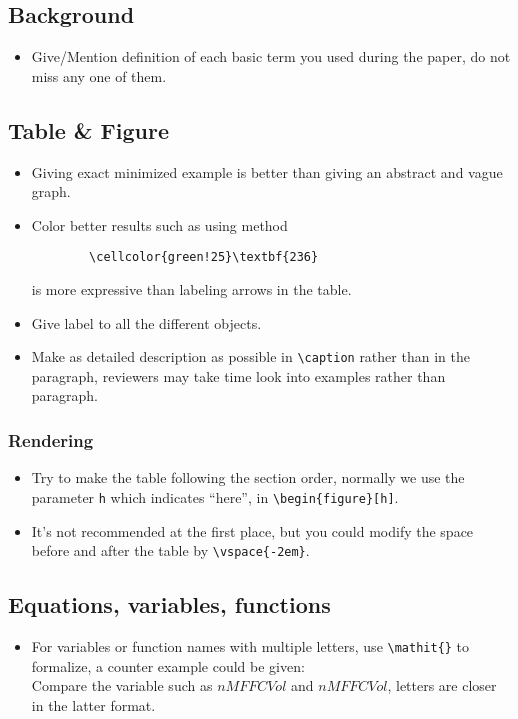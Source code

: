 \documentclass[acmsmall,screen,review]{acmart}
\begin{document}
\subsection{Background}
\begin{itemize}
    \item Give/Mention definition of each basic term you used during the paper, do not miss any one of them.
\end{itemize}

\subsection{Table \& Figure}
\begin{itemize}
    \item Giving exact minimized example is better than giving an abstract and vague graph.
    \item Color better results such as using method
    \begin{verbatim}
        \cellcolor{green!25}\textbf{236}
    \end{verbatim}
    \vspace{-\baselineskip}
    is more expressive than labeling arrows in the table.
    \item Give label to all the different objects.
    \item Make as detailed description as possible in \verb+\caption+ rather than in the paragraph, reviewers may take time look into examples rather than paragraph.
\end{itemize}

\subsubsection{Rendering}
\begin{itemize}
    \item Try to make the table following the section order, normally we use the parameter \verb+h+ which indicates ``here'', in \verb+\begin{figure}[h]+.
    \item It's not recommended at the first place, but you could modify the space before and after the table by \verb+\vspace{-2em}+.
    
\end{itemize}

\subsection{Equations, variables, functions}
\begin{itemize}
    \item For variables or function names with multiple letters, use \verb+\mathit{}+ to formalize, a counter example could be given:\\
    Compare the variable such as $nMFFCVol$ and $\mathit{nMFFCVol}$, letters are closer in the latter format.

\end{itemize}
\end{document}
